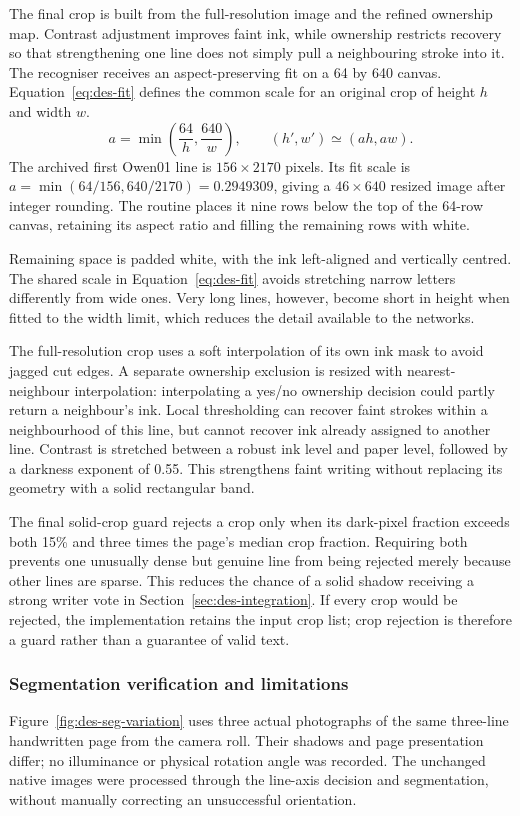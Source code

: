 The final crop is built from the full-resolution image and the refined ownership map. Contrast adjustment improves faint ink, while ownership restricts recovery so that strengthening one line does not simply pull a neighbouring stroke into it. The recogniser receives an aspect-preserving fit on a 64 by 640 canvas. Equation~\ref{eq:des-fit} defines the common scale for an original crop of height $h$ and width $w$.
\begin{equation}
a=\min\left(\frac{64}{h},\frac{640}{w}\right),\qquad
(h',w')\simeq(ah,aw).
\label{eq:des-fit}
\end{equation}
The archived first Owen01 line is $156\times2170$ pixels. Its fit scale is $a=\min(64/156,640/2170)=0.2949309$, giving a $46\times640$ resized image after integer rounding. The routine places it nine rows below the top of the 64-row canvas, retaining its aspect ratio and filling the remaining rows with white.

Remaining space is padded white, with the ink left-aligned and vertically centred. The shared scale in Equation~\ref{eq:des-fit} avoids stretching narrow letters differently from wide ones. Very long lines, however, become short in height when fitted to the width limit, which reduces the detail available to the networks.

The full-resolution crop uses a soft interpolation of its own ink mask to avoid jagged cut edges. A separate ownership exclusion is resized with nearest-neighbour interpolation: interpolating a yes/no ownership decision could partly return a neighbour's ink. Local thresholding can recover faint strokes within a neighbourhood of this line, but cannot recover ink already assigned to another line. Contrast is stretched between a robust ink level and paper level, followed by a darkness exponent of 0.55. This strengthens faint writing without replacing its geometry with a solid rectangular band.

The final solid-crop guard rejects a crop only when its dark-pixel fraction exceeds both 15\% and three times the page's median crop fraction. Requiring both prevents one unusually dense but genuine line from being rejected merely because other lines are sparse. This reduces the chance of a solid shadow receiving a strong writer vote in Section~\ref{sec:des-integration}. If every crop would be rejected, the implementation retains the input crop list; crop rejection is therefore a guard rather than a guarantee of valid text.

\subsubsection{Segmentation verification and limitations}
\label{sec:des-segverify}
Figure~\ref{fig:des-seg-variation} uses three actual photographs of the same three-line handwritten page from the camera roll. Their shadows and page presentation differ; no illuminance or physical rotation angle was recorded. The unchanged native images were processed through the line-axis decision and segmentation, without manually correcting an unsuccessful orientation.


